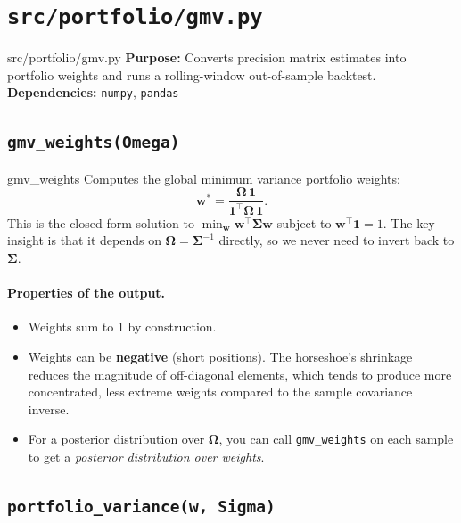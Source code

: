 \documentclass[11pt,a4paper]{article}
\newcommand{\bOmega}{\bm{\Omega}}
\newcommand{\bSigma}{\bm{\Sigma}}
\begin{document}
\section{\texttt{src/portfolio/gmv.py}}\label{sec:gmv}

\begin{filecard}{src/portfolio/gmv.py}
\textbf{Purpose:} Converts precision matrix estimates into portfolio weights and runs a rolling-window out-of-sample backtest.
\\[0.3em]
\textbf{Dependencies:} \texttt{numpy}, \texttt{pandas}
\end{filecard}

\subsection{\texttt{gmv\_weights(Omega)}}

\begin{funccard}{gmv\_weights}
Computes the global minimum variance portfolio weights:
\[
  \bm{w}^* = \frac{\bOmega\,\bm{1}}{\bm{1}^\top\bOmega\,\bm{1}}.
\]
This is the closed-form solution to $\min_{\bm{w}} \bm{w}^\top\bSigma\bm{w}$ subject to $\bm{w}^\top\bm{1} = 1$. The key insight is that it depends on $\bOmega = \bSigma^{-1}$ directly, so we never need to invert back to $\bSigma$.
\end{funccard}

\paragraph{Properties of the output.}
\begin{itemize}[nosep]
  \item Weights sum to 1 by construction.
  \item Weights can be \textbf{negative} (short positions). The horseshoe's shrinkage reduces the magnitude of off-diagonal elements, which tends to produce more concentrated, less extreme weights compared to the sample covariance inverse.
  \item For a posterior distribution over $\bOmega$, you can call \texttt{gmv\_weights} on each sample to get a \emph{posterior distribution over weights}.
\end{itemize}

\subsection{\texttt{portfolio\_variance(w, Sigma)}}
\end{document}
